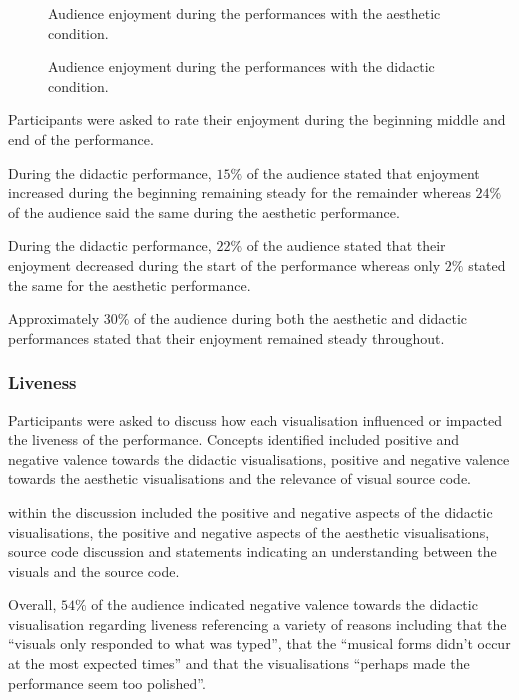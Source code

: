 \documentclass{sig-alternate}
\begin{document}
\begin{figure}
\centering
{}
\caption{Audience enjoyment during the performances with the aesthetic condition.}
\end{figure}

\begin{figure}
\centering
{}
\caption{Audience enjoyment during the performances with the didactic condition.}
\end{figure}

Participants were asked to rate their enjoyment during the beginning middle and end of the performance.

During the didactic performance, $15\%$ of the audience stated that enjoyment increased during the beginning remaining steady for the remainder whereas $24\%$ of the audience said the same during the aesthetic performance.

During the didactic performance, $22\%$ of the audience stated that their enjoyment decreased during the start of the performance whereas only $2\%$ stated the same for the aesthetic performance.

Approximately $30\%$ of the audience during both the aesthetic and didactic performances stated that their enjoyment remained steady throughout.

\subsubsection{Liveness}

Participants were asked to discuss how each visualisation influenced or impacted the liveness of the performance. Concepts identified included positive and negative valence towards the didactic visualisations, positive and negative valence towards the aesthetic visualisations and the relevance of visual source code. 

within the discussion included the positive and negative aspects of the didactic visualisations, the positive and negative aspects of the aesthetic visualisations, source code discussion and statements indicating an understanding between the visuals and the source code.

Overall, $54\%$ of the audience indicated negative valence towards the didactic visualisation regarding liveness referencing a variety of reasons including that the ``visuals only responded to what was typed'', that the ``musical forms didn't occur at the most expected times'' and that the visualisations ``perhaps made the performance seem too polished''.
\end{document}
